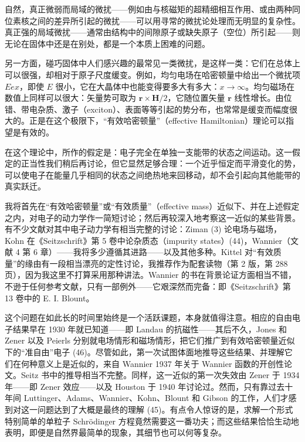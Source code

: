 自然，真正微弱而局域的微扰——例如由与核磁矩的超精细相互作用、或由两种同位素核之间的差异所引起的微扰——可以用寻常的微扰论处理而无明显的复杂性。真正强的局域微扰——通常由结构中的间隙原子或缺失原子（空位）所引起——则无论在固体中还是在别处，都是一个本质上困难的问题。


另一方面，碰巧固体中人们感兴趣的最常见一类微扰，是这样一类：它们在总体上可以很强，却相对于原子尺度缓变。例如，均匀电场在哈密顿量中给出一个微扰项 $Eex$，即使 $E$ 很小，它在大晶体中也能变得要多大有多大：$x \to \infty$。均匀磁场在数值上同样可以很大：矢量势可取为 $\mathbf{r} \times \mathbf{H}/2$，它随位置矢量 $\mathbf{r}$ 线性增长。由位错、带电杂质、激子（exciton）、表面等等引起的势分布，也常常是缓变而幅度很大的。正是在这个极限下，“有效哈密顿量”（effective Hamiltonian）理论可以指望是有效的。

在这个理论中，所作的假定是：电子完全在单独一支能带的状态之间运动。这一假定的正当性我们稍后再讨论，但它显然足够合理：一个近乎恒定而平滑变化的势，可以使电子在能量几乎相同的状态之间绝热地来回移动，却不会引起向其他能带的真实跃迁。

我将首先在“有效哈密顿量”或“有效质量”（effective mass）近似下、并在上述假定之内，对电子的动力学作一简短讨论；然后再较深入地考察这一近似的某些背景。有不少文献对其中电子动力学有相当完整的讨论：Ziman (3) 论电场与磁场，Kohn 在《Seitzschrift》第 5 卷中论杂质态（impurity states）(44)，Wannier（文献 4 第 6 章）——我将多少遵循其进路——以及其他多种。Kittel 对“有效质量”的缘由有一段相当漂亮的定性讨论，我推荐作为配套读物（第 2 版，第 288 页），因为我这里不打算采用那种讲法。Wannier 的书在背景论证方面相当不错，不逊于任何参考文献，只有一部例外——它艰深然而完备：即《Seitzschrift》第 13 卷中的 E. I. Blount。

这个问题在如此长的时间里始终是一个活跃课题，本身就值得注意。相应的自由电子结果早在 1930 年就已知道——即 Landau 的抗磁性——其后不久，Jones 和 Zener 以及 Peierls 分别就电场情形和磁场情形，把它们推广到有效哈密顿量近似下的“准自由”电子 (46)。尽管如此，第一次试图体面地推导这些结果、并理解它们在何种意义上是近似的，来自 Wannier 1937 年关于 Wannier 函数的开创性论文。Seitz 书中的推导相当不完整。同样，这一近似的第一次失效由 Zener 于 1934 年——即 Zener 效应——以及 Houston 于 1940 年讨论过。然而，只有靠过去十年间 Luttinger、Adams、Wannier、Kohn、Blount 和 Gibson 的工作，人们才感到对这一问题达到了大概是最终的理解 (45)。有点令人惊讶的是，求解一个形式特别简单的单粒子 Schrödinger 方程竟然需要这一番功夫；而这些结果恰恰生动地表明，即便是自然界最简单的现象，其细节也可以何等复杂。

